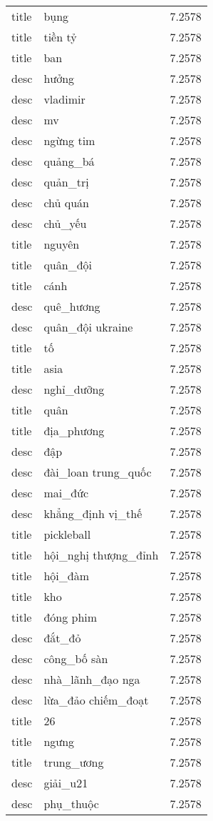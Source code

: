 \documentclass{article}
\begin{document}
\begin{tabular}{lll}
title & bụng & 7.2578\\
title & tiền tỷ & 7.2578\\
title & ban & 7.2578\\
desc & hưởng & 7.2578\\
desc & vladimir & 7.2578\\
desc & mv & 7.2578\\
desc & ngừng tim & 7.2578\\
desc & quảng\_bá & 7.2578\\
desc & quản\_trị & 7.2578\\
desc & chủ quán & 7.2578\\
desc & chủ\_yếu & 7.2578\\
title & nguyên & 7.2578\\
title & quân\_đội & 7.2578\\
title & cánh & 7.2578\\
desc & quê\_hương & 7.2578\\
desc & quân\_đội ukraine & 7.2578\\
title & tố & 7.2578\\
title & asia & 7.2578\\
desc & nghỉ\_dưỡng & 7.2578\\
title & quân & 7.2578\\
title & địa\_phương & 7.2578\\
desc & đập & 7.2578\\
desc & đài\_loan trung\_quốc & 7.2578\\
desc & mai\_đức & 7.2578\\
desc & khẳng\_định vị\_thế & 7.2578\\
title & pickleball & 7.2578\\
title & hội\_nghị thượng\_đỉnh & 7.2578\\
title & hội\_đàm & 7.2578\\
title & kho & 7.2578\\
title & đóng phim & 7.2578\\
desc & đắt\_đỏ & 7.2578\\
desc & công\_bố sàn & 7.2578\\
desc & nhà\_lãnh\_đạo nga & 7.2578\\
desc & lừa\_đảo chiếm\_đoạt & 7.2578\\
title & 26 & 7.2578\\
title & ngưng & 7.2578\\
title & trung\_ương & 7.2578\\
desc & giải\_u21 & 7.2578\\
desc & phụ\_thuộc & 7.2578\\

\end{tabular}
\end{document}
